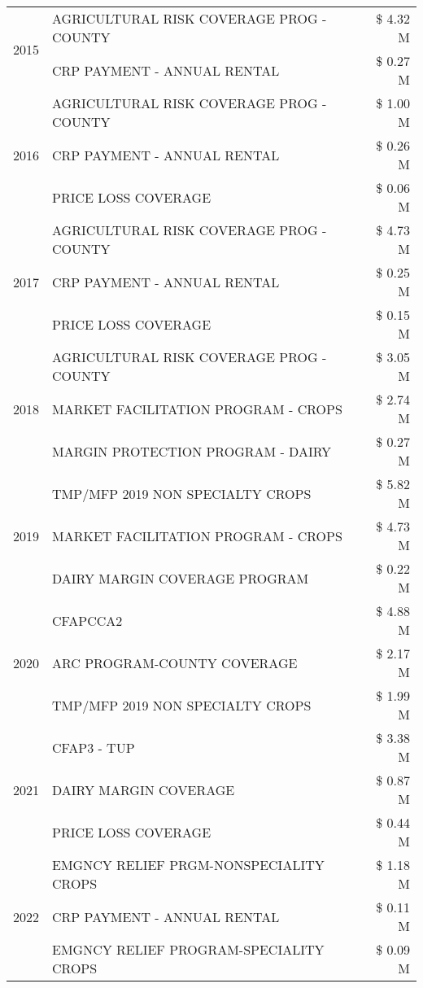 \begin{tabular}{llr}
\cline{1-3}
\multirow[t]{2}{*}{2015} & AGRICULTURAL RISK COVERAGE PROG - COUNTY & \$ 4.32 M \\
 & CRP PAYMENT - ANNUAL RENTAL & \$ 0.27 M \\
\cline{1-3}
\multirow[t]{3}{*}{2016} & AGRICULTURAL RISK COVERAGE PROG - COUNTY & \$ 1.00 M \\
 & CRP PAYMENT - ANNUAL RENTAL & \$ 0.26 M \\
 & PRICE LOSS COVERAGE & \$ 0.06 M \\
\cline{1-3}
\multirow[t]{3}{*}{2017} & AGRICULTURAL RISK COVERAGE PROG - COUNTY & \$ 4.73 M \\
 & CRP PAYMENT - ANNUAL RENTAL & \$ 0.25 M \\
 & PRICE LOSS COVERAGE & \$ 0.15 M \\
\cline{1-3}
\multirow[t]{3}{*}{2018} & AGRICULTURAL RISK COVERAGE PROG - COUNTY & \$ 3.05 M \\
 & MARKET FACILITATION PROGRAM - CROPS & \$ 2.74 M \\
 & MARGIN PROTECTION PROGRAM - DAIRY & \$ 0.27 M \\
\cline{1-3}
\multirow[t]{3}{*}{2019} & TMP/MFP 2019 NON SPECIALTY CROPS & \$ 5.82 M \\
 & MARKET FACILITATION PROGRAM - CROPS & \$ 4.73 M \\
 & DAIRY MARGIN COVERAGE PROGRAM & \$ 0.22 M \\
\cline{1-3}
\multirow[t]{3}{*}{2020} & CFAPCCA2 & \$ 4.88 M \\
 & ARC PROGRAM-COUNTY COVERAGE & \$ 2.17 M \\
 & TMP/MFP 2019 NON SPECIALTY CROPS & \$ 1.99 M \\
\cline{1-3}
\multirow[t]{3}{*}{2021} & CFAP3 - TUP & \$ 3.38 M \\
 & DAIRY MARGIN COVERAGE & \$ 0.87 M \\
 & PRICE LOSS COVERAGE & \$ 0.44 M \\
\cline{1-3}
\multirow[t]{3}{*}{2022} & EMGNCY RELIEF PRGM-NONSPECIALITY CROPS & \$ 1.18 M \\
 & CRP PAYMENT - ANNUAL RENTAL & \$ 0.11 M \\
 & EMGNCY RELIEF PROGRAM-SPECIALITY CROPS & \$ 0.09 M \\
\cline{1-3}
\bottomrule
\end{tabular}

